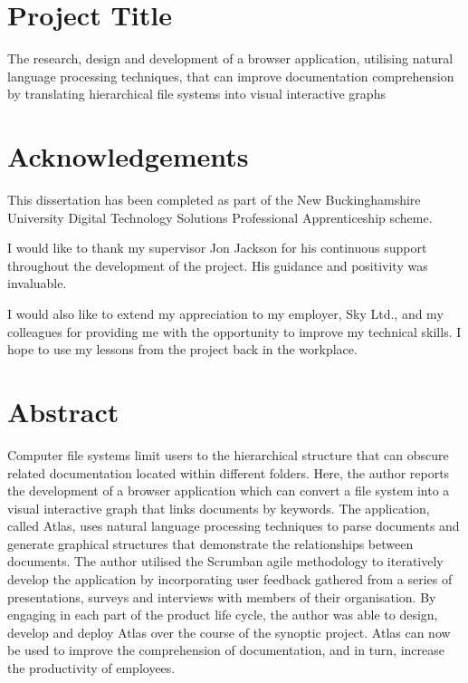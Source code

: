 \documentclass{article}
\begin{document}
\newpage

\section*{Project Title}
The research, design and development of a browser application, utilising natural language processing techniques, that can improve documentation comprehension by translating hierarchical file systems into visual interactive graphs

\newpage

\section*{Acknowledgements}
This dissertation has been completed as part of the New Buckinghamshire University Digital Technology Solutions Professional Apprenticeship scheme.

I would like to thank my supervisor Jon Jackson for his continuous support throughout the development of the project. His guidance and positivity was invaluable.

I would also like to extend my appreciation to my employer, Sky Ltd., and my colleagues for providing me with the opportunity to improve my technical skills. I hope to use my lessons from the project back in the workplace.

\newpage

\section*{Abstract}
Computer file systems limit users to the hierarchical structure that can obscure related documentation located within different folders. Here, the author reports the development of a browser application which can convert a file system into a visual interactive graph that links documents by keywords. The application, called Atlas, uses natural language processing techniques to parse documents and generate graphical structures that demonstrate the relationships between documents. The author utilised the Scrumban agile methodology to iteratively develop the application by incorporating user feedback gathered from a series of presentations, surveys and interviews with members of their organisation. By engaging in each part of the product life cycle, the author was able to design, develop and deploy Atlas over the course of the synoptic project. Atlas can now be used to improve the comprehension of documentation, and in turn, increase the productivity of employees.
\end{document}
